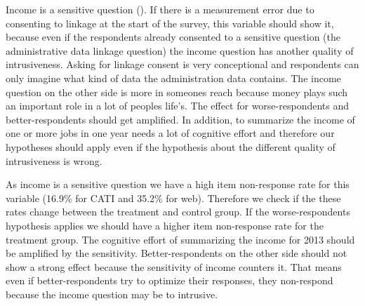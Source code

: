 Income is a sensitive question (\cite{Tourangeauetal07}). If there is a measurement error due to consenting to linkage at the start of the survey, this variable should show it, because even if the respondents already consented to a sensitive question (the administrative data linkage question) the income question has another quality of intrusiveness. Asking for linkage consent is very conceptional and respondents can only imagine what kind of data the administration data contains. The income question on the other side is more in someones reach because money plays such an important role in a lot of peoples life's. The effect for worse-respondents and better-respondents should get amplified. In addition, to summarize the income of one or more jobs in one year needs a lot of cognitive effort and therefore our hypotheses should apply even if the hypothesis about the different quality of intrusiveness is wrong.

As income is a sensitive question we have a high item non-response rate for this variable (16.9\% for CATI and 35.2\% for web). Therefore we check if the these rates change between the treatment and control group. If the worse-respondents hypothesis applies we should have a higher item non-response rate for the treatment group. The cognitive effort of summarizing the income for 2013 should be amplified by the sensitivity. Better-respondents on the other side should not show a strong effect because the sensitivity of income counters it. That means even if better-respondents try to optimize their responses, they non-respond because the income question may be to intrusive.
